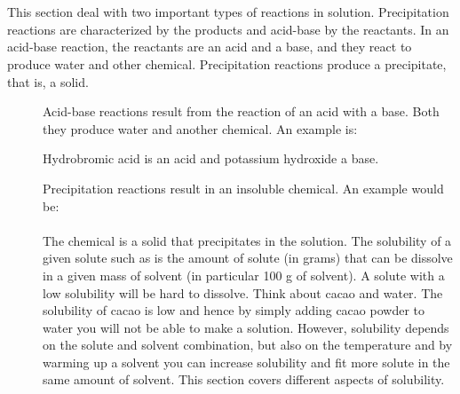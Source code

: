 \documentclass[main.tex]{subfiles} %
\begin{document}
\section{\color{blue!30!black}{Precipitation reactions and acid-base reactions}}
This section deal with two important types of reactions in solution. Precipitation reactions are characterized by the products and acid-base by the reactants. In an acid-base reaction, the reactants are an acid and a base, and they react to produce water and other chemical. Precipitation reactions produce a precipitate, that is, a solid.
\sloppy 
\begin{description}

\item[] Acid-base reactions result from the reaction of an acid with a base. Both they produce water and another chemical. An example is:
\begin{center}\end{center}
Hydrobromic acid  is an acid and potassium hydroxide a base.

\item[] Precipitation reactions result in an insoluble chemical. An example would be:\\
\\
The chemical  is a solid that precipitates in the solution.
The solubility of a given solute such as  is the amount of solute (in grams) that can be dissolve in a given mass of solvent (in particular 100 g of solvent). A solute with a low solubility will be hard to dissolve. Think about cacao and water. The solubility of cacao is low and hence by simply adding cacao powder to water you will not be able to make a solution. However, solubility depends on the solute and solvent combination, but also on the temperature and by warming up a solvent you can increase solubility and fit more solute in the same amount of solvent. This section covers different aspects of solubility.


\end{description}
\end{document}
